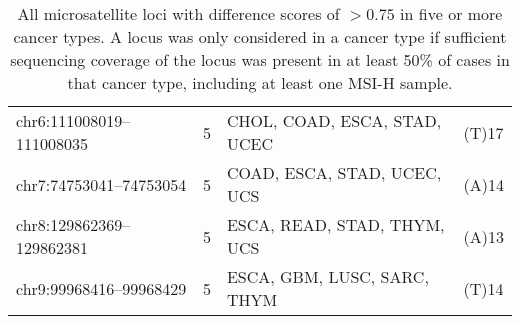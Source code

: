 \begin{landscape}
\begin{table}[htp]
\begin{tabular}{lcll}
    		chr6:111008019--111008035 & 5     & CHOL, COAD, ESCA, STAD, UCEC & (T)17 \\
    		chr7:74753041--74753054 & 5     & COAD, ESCA, STAD, UCEC, UCS & (A)14 \\
    		chr8:129862369--129862381 & 5     & ESCA, READ, STAD, THYM, UCS & (A)13 \\
    		chr9:99968416--99968429 & 5     & ESCA, GBM, LUSC, SARC, THYM & (T)14 \\
    	\end{tabular}
    	\caption[All microsatellite loci with difference scores of $>0.75$ in $\ge 5$ cancer types.]{All microsatellite loci with difference scores of $>0.75$ in five or more cancer types. A locus was only considered in a cancer type if sufficient sequencing coverage of the locus was present in at least 50\% of cases in that cancer type, including at least one MSI-H sample.}
    	\label{table:msilandscape:top_loci_landscape}
    \end{table}
\end{landscape}
